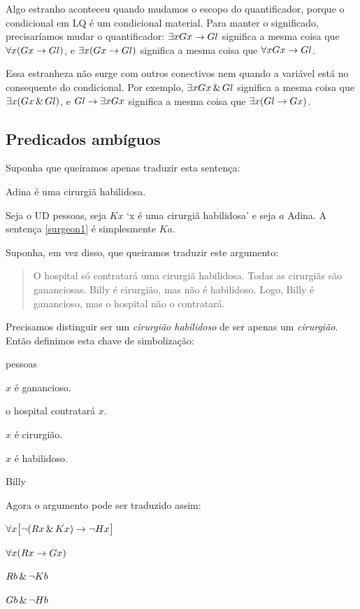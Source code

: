 Algo estranho aconteceu quando mudamos o escopo do quantificador, porque o condicional em LQ é um condicional material. Para manter o significado, precisaríamos mudar o quantificador: $\exists x Gx \rightarrow Gl$ significa a mesma coisa que $\forall x (Gx \rightarrow Gl)$, e $\exists x (Gx \rightarrow Gl)$ significa a mesma coisa que $\forall x Gx \rightarrow Gl$.

Essa estranheza não surge com outros conectivos nem quando a variável está no consequente do condicional. Por exemplo, $\exists x Gx \,\&\, Gl$ significa a mesma coisa que $\exists x (Gx \,\&\, Gl)$, e $Gl \rightarrow \exists x Gx$ significa a mesma coisa que $\exists x(Gl \rightarrow Gx)$.


\subsection{Predicados ambíguos}

Suponha que queiramos apenas traduzir esta sentença:
\begin{earg}
\item[\ex{surgeon1}] Adina é uma cirurgiã habilidosa.
\end{earg}
Seja o UD pessoas, seja $Kx$ `x é uma cirurgiã habilidosa' e seja $a$ Adina. A sentença \ref{surgeon1} é simplesmente $Ka$.

Suponha, em vez disso, que queiramos traduzir este argumento:
\begin{quote}
O hospital só contratará uma cirurgiã habilidosa. Todas as cirurgiãs são gananciosas. Billy é cirurgião, mas não é habilidoso. Logo, Billy é ganancioso, mas o hospital não o contratará.
\end{quote}
Precisamos distinguir ser um \emph{cirurgião habilidoso} de ser apenas um \emph{cirurgião}. Então definimos esta chave de simbolização:
\begin{ekey}
\item[UD:] pessoas
\item[Gx:] $x$ é ganancioso.
\item[Hx:] o hospital contratará $x$.
\item[Rx:] $x$ é cirurgião.
\item[Kx:] $x$ é habilidoso.
\item[b:] Billy
\end{ekey}

Agora o argumento pode ser traduzido assim:
\begin{earg}
\label{surgeon2}
\item[] $\forall x\bigl[\neg (Rx \,\&\, Kx) \rightarrow \neg Hx\bigr]$
\item[] $\forall x(Rx \rightarrow Gx)$
\item[] $Rb \,\&\, \neg Kb$
\item[\therefore] $Gb \,\&\, \neg Hb$
\end{earg}

